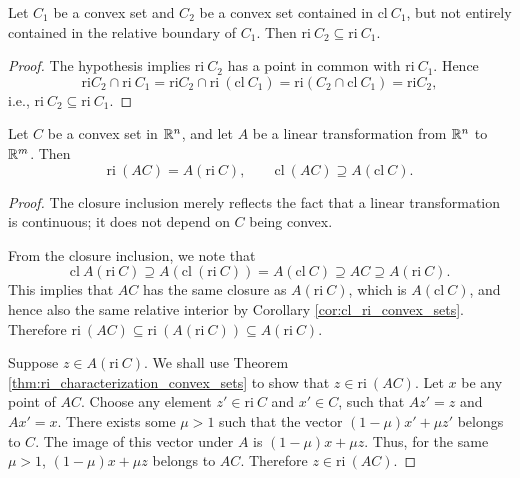 \documentclass[11pt,a4paper]{article}
\begin{document}
\begin{corollary}
    Let $C_1$ be a convex set and $C_2$ be a convex set contained in $\mathrm{cl}\ C_1$, but not entirely contained in the relative boundary of $C_1$. Then $\mathrm{ri}\ C_2\subseteq \mathrm{ri}\ C_1$.
\end{corollary}

\begin{proof}
    The hypothesis implies $\mathrm{ri}\ C_2$ has a point in common with $\mathrm{ri}\ C_1$. Hence
    \begin{equation*}
        \mathrm{ri} C_2\cap \mathrm{ri}\ C_1 = \mathrm{ri} C_2\cap \mathrm{ri}\ (\mathrm{cl}\ C_1) = \mathrm{ri} (C_2\cap \mathrm{cl}\ C_1) = \mathrm{ri} C_2,
    \end{equation*}
    i.e., $\mathrm{ri}\ C_2\subseteq \mathrm{ri}\ C_1$.
\end{proof}

\begin{theorem}\label{thm:ri_cl_linear_transformation}
    Let $C$ be a convex set in $\mathbb{R}^n$, and let $A$ be a linear transformation from $\mathbb{R}^n$ to $\mathbb{R}^m$. Then
    \begin{equation*}
        \mathrm{ri}\ (AC) = A(\mathrm{ri}\ C),\qquad \mathrm{cl}\ (AC) \supseteq A(\mathrm{cl}\ C).
    \end{equation*}
\end{theorem}

\begin{proof}
    The closure inclusion merely reflects the fact that a linear transformation is continuous; it does not depend on $C$ being convex.

    \noindent \forward From the closure inclusion, we note that
    \begin{equation*}
        \mathrm{cl}\ A(\mathrm{ri}\ C) \supseteq A(\mathrm{cl}\ (\mathrm{ri}\ C)) = A(\mathrm{cl}\ C) \supseteq AC\supseteq A(\mathrm{ri}\ C).
    \end{equation*}
    This implies that $AC$ has the same closure as $A(\mathrm{ri}\ C)$, which is $A(\mathrm{cl}\ C)$, and hence also the same relative interior by Corollary \ref{cor:cl_ri_convex_sets}. Therefore $\mathrm{ri}\ (AC) \subseteq \mathrm{ri}\ (A(\mathrm{ri}\ C))\subseteq A(\mathrm{ri}\ C)$.

    \noindent \converse Suppose $z\in A(\mathrm{ri}\ C)$. We shall use Theorem \ref{thm:ri_characterization_convex_sets} to show that $z\in \mathrm{ri}\ (AC)$. Let $x$ be any point of $AC$. Choose any element $z'\in \mathrm{ri}\ C$ and $x'\in C$, such that $Az' = z$ and $Ax' = x$. There exists some $\mu>1$ such that the vector $(1-\mu)x'+\mu z'$ belongs to $C$. The image of this vector under $A$ is $(1-\mu)x+\mu z$. Thus, for the same $\mu>1$, $(1-\mu)x+\mu z$ belongs to $AC$. Therefore $z\in \mathrm{ri}\ (AC)$.
\end{proof}
\end{document}
